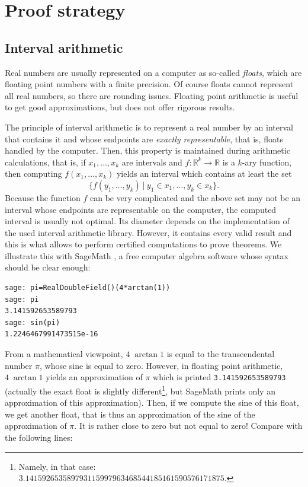 \documentclass[11pt]{article}
\begin{document}
\section{Proof strategy}
\label{sec:strategy}

\subsection{Interval arithmetic}

Real numbers are usually represented on a computer as so-called {\em floats}, which are floating point numbers with a finite precision.
Of course floats cannot represent all real numbers, so there are rounding issues.
Floating point arithmetic is useful to get good approximations, but does not offer rigorous results.

The principle of interval arithmetic is to represent a real number by an interval that contains it and whose endpoints are {\em exactly representable}, that is, floats handled by the computer.
Then, this property is maintained during arithmetic calculations, that is, if $x_1,\ldots,x_k$ are intervals and $f:\mathbb{R}^k\to\mathbb{R}$ is a $k$-ary function, then computing $f(x_1,\ldots,x_k)$ yields an interval which contains at least the set
\[
\{f(y_1,\ldots,y_k)~|~y_1\in x_1,\ldots,y_k\in x_k\}.
\]
Because the function $f$ can be very complicated and the above set may not be an interval whose endpoints are representable on the computer, the computed interval is usually not optimal.
Its diameter depends on the implementation of the used interval arithmetic library.
However, it contains every valid result and this is what allows to perform certified computations to prove theorems.
We illustrate this with SageMath \cite{sage}, a free computer algebra software whose syntax should be clear enough:
\begin{verbatim}
sage: pi=RealDoubleField()(4*arctan(1))
sage: pi
3.141592653589793
sage: sin(pi)
1.2246467991473515e-16
\end{verbatim}
From a mathematical viewpoint, $4\;\arctan{1}$ is equal to the transcendental number $\pi$, whose sine is equal to zero.
However, in floating point arithmetic, $4\;\arctan{1}$ yields an approximation of $\pi$ which is printed \verb+3.141592653589793+ (actually the exact float is slightly different\footnote{Namely, in that case: $3.141592653589793115997963468544185161590576171875$.}, but SageMath prints only an approximation of this approximation).
Then, if we compute the sine of this float, we get another float, that is thus an approximation of the sine of the approximation of $\pi$.
It is rather close to zero but not equal to zero!
Compare with the following lines:
\end{document}
